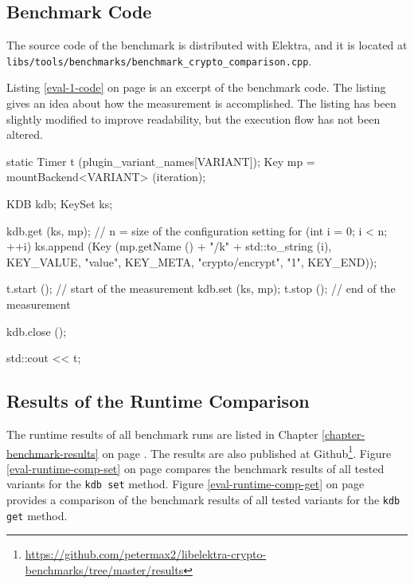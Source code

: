   \subsection{Benchmark Code}

The source code of the benchmark is distributed with Elektra, and it is located at\\
\texttt{libs/tools/benchmarks/benchmark\_crypto\_comparison.cpp}.

Listing \ref{eval-1-code} on page \pageref{eval-1-code} is an excerpt of the benchmark code.
The listing gives an idea about how the measurement is accomplished.
The listing has been slightly modified to improve readability, but the execution flow has not been altered.

\begin{code}[label=eval-1-code,language=C,caption={Excerpt of Benchmark 1}]
static Timer t (plugin_variant_names[VARIANT]);
Key mp = mountBackend<VARIANT> (iteration);
{
  KDB kdb;
  KeySet ks;

  kdb.get (ks, mp);
  // n = size of the configuration setting
  for (int i = 0; i < n; ++i)
  {
    ks.append (Key (mp.getName () + "/k" + std::to_string (i),
      KEY_VALUE, "value",
      KEY_META, "crypto/encrypt", "1",
      KEY_END));
  }

  t.start (); // start of the measurement
  kdb.set (ks, mp);
  t.stop (); // end of the measurement

  kdb.close ();
}
std::cout << t;
\end{code}

  \subsection{Results of the Runtime Comparison}
  \label{eval-section-runtime-results}

The runtime results of all benchmark runs are listed in Chapter \ref{chapter-benchmark-results} on page \pageref{chapter-benchmark-results}.
The results are also published at Github\footnote{\url{https://github.com/petermax2/libelektra-crypto-benchmarks/tree/master/results}}.
Figure \ref{eval-runtime-comp-set} on page \pageref{eval-runtime-comp-set} compares the benchmark results of all tested variants for the \texttt{kdb set} method.
Figure \ref{eval-runtime-comp-get} on page \pageref{eval-runtime-comp-get} provides a comparison of the benchmark results of all tested variants for the \texttt{kdb get} method.

